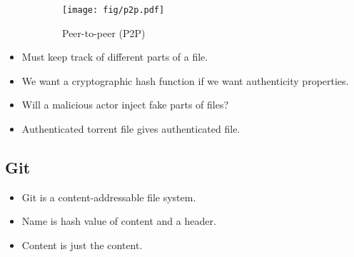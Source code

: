 \begin{frame}
  \begin{figure}
    \begin{subfigure}{0.45\columnwidth}
      \centering
      \texttt{[image: fig/p2p.pdf]}
      \caption{Peer-to-peer (P2P)}
    \end{subfigure}
    \hfill
    \begin{subfigure}{0.45\columnwidth}
    \end{subfigure}
  \end{figure}

  \begin{solution}
    \begin{itemize}
      \item Must keep track of different parts of a file.
    \end{itemize}
  \end{solution}
\end{frame}

\begin{frame}
  \begin{remark}
    \begin{itemize}
      \item We want a cryptographic hash function if we want authenticity 
        properties.
      \item Will a malicious actor inject fake parts of files?
      \item Authenticated torrent file gives authenticated file.
    \end{itemize}
  \end{remark}
\end{frame}


\subsection{Git}

\begin{frame}
  \begin{remark}
    \begin{itemize}
      \item Git is a content-addressable file system.
    \end{itemize}
  \end{remark}

  \pause

  \begin{definition}
    \begin{itemize}
      \item Name is hash value of content and a header.
      \item Content is just the content.
    \end{itemize}
  \end{definition}
\end{frame}

